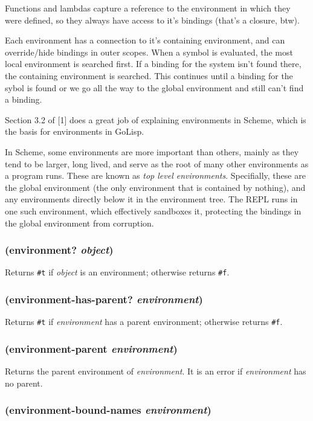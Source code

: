 \documentclass{article}
\begin{document}
Functions and lambdas capture a reference to the environment in which they were defined, so
they always have access to it's bindings (that's a closure, btw).

Each environment has a connection to it's containing environment, and can override/hide
bindings in outer scopes. When a symbol is evaluated, the most local environment is searched
first. If a binding for the system isn't found there, the containing environment is searched.
This continues until a binding for the sybol is found or we go all the way to the global
environment and still can't find a binding.

Section 3.2 of [1] does a great job of explaining environments in Scheme, which is the basis
for environments in GoLisp.

In Scheme, some environments are more important than others, mainly as they tend to be larger,
long lived, and serve as the root of many other environments as a program runs. These are
known as \emph{top level environments}. Specifially, these are the global environment (the
only environment that is contained by nothing), and any environments directly below it in the
environment tree. The REPL runs in one such environment, which effectively sandboxes it,
protecting the bindings in the global environment from corruption.

\subsubsection{(environment? \emph{object})}

Returns \verb|#t| if \emph{object} is an environment; otherwise returns \verb|#f|.

\subsubsection{(environment-has-parent? \emph{environment})}

Returns \verb|#t| if \emph{environment} has a parent environment; otherwise returns
\verb|#f|.

\subsubsection{(environment-parent \emph{environment})}

Returns the parent environment of \emph{environment}. It is an error if \emph{environment} has
no parent.

\subsubsection{(environment-bound-names \emph{environment})}
\end{document}
